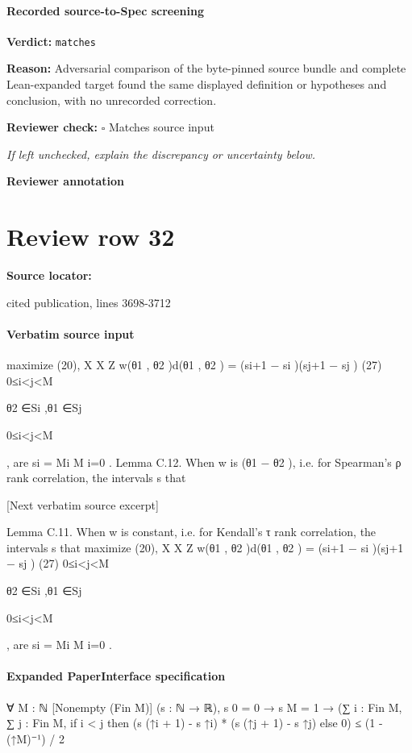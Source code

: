 \documentclass[10pt]{article}
\newcommand{\reviewerbox}{%
  \par\noindent\fbox{\parbox{0.96\linewidth}{\rule{0pt}{0.38in}}}\par
}
\newcommand{\reviewmatch}[1]{%
  \par\noindent\textbf{Reviewer check:} $\square$\; #1\par
  \noindent\emph{If left unchecked, explain the discrepancy or uncertainty below.}\par
}
\begin{document}
\paragraph{Recorded source-to-Spec screening}
\textbf{Verdict:} \texttt{matches}
\\
{\raggedright
\textbf{Reason:} Adversarial comparison of the byte-\allowbreak{}pinned source bundle and complete Lean-\allowbreak{}expanded target found the same displayed definition or hypotheses and conclusion, with no unrecorded correction.\allowbreak{}
\par}
\reviewmatch{Matches source input}
\noindent\textbf{Reviewer annotation}\par
\reviewerbox
\clearpage
\hypertarget{source-claim-75f334c9ed5f4c67}{}
\section*{Review row 32}
\textbf{Source locator:} {\footnotesize\raggedright cited publication, lines 3698-\allowbreak{}3712\par}
\paragraph{Verbatim source input}
\begin{ReviewVerbatim}
maximize (20),
X
X Z
w(θ1 , θ2 )d(θ1 , θ2 ) =
(si+1 − si )(sj+1 − sj )
(27)
0≤i<j<M

θ2 ∈Si ,θ1 ∈Sj

0≤i<j<M

, are {si = Mi }M
i=0 .
Lemma C.12. When w is (θ1 − θ2 ), i.e. for Spearman’s ρ rank correlation, the intervals s that

[Next verbatim source excerpt]

Lemma C.11. When w is constant, i.e. for Kendall’s τ rank correlation, the intervals s that
maximize (20),
X
X Z
w(θ1 , θ2 )d(θ1 , θ2 ) =
(si+1 − si )(sj+1 − sj )
(27)
0≤i<j<M

θ2 ∈Si ,θ1 ∈Sj

0≤i<j<M

, are {si = Mi }M
i=0 .
\end{ReviewVerbatim}



\paragraph{Expanded PaperInterface specification}
\begin{ReviewVerbatim}
∀ {M : ℕ} [Nonempty (Fin M)] (s : ℕ → ℝ),
  s 0 = 0 →
    s M = 1 →
      (∑ i : Fin M, ∑ j : Fin M, if i < j then (s (↑i + 1) - s ↑i) * (s (↑j + 1) - s ↑j) else 0) ≤ (1 - (↑M)⁻¹) / 2
\end{ReviewVerbatim}
\end{document}
